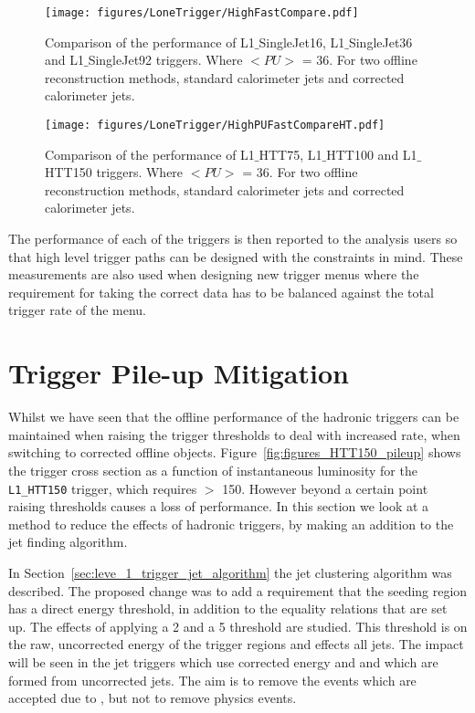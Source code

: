 \begin{figure}[htbp]
  \centering
    \texttt{[image: figures/LoneTrigger/HighFastCompare.pdf]}
  \caption{Comparison of the performance of L1$\_$SingleJet16, L1$\_$SingleJet36 and L1$\_$SingleJet92 triggers. Where $<PU>$ = 36. For two offline reconstruction methods, standard \AK calorimeter jets and \pu corrected \AK calorimeter jets.}
  \label{fig:figures_LoneTrigger_HighFastCompare}
\end{figure}

\begin{figure}[htbp]
  \centering
    \texttt{[image: figures/LoneTrigger/HighPUFastCompareHT.pdf]}
  \caption{Comparison of the performance of  L1$\_$HTT75, L1$\_$HTT100 and  L1$\_$HTT150 triggers. Where $<PU>$ = 36. For two offline reconstruction methods, standard \AK calorimeter jets and \pu corrected \AK calorimeter jets.}
  \label{fig:figures_LoneTrigger_HighPUFastCompareHT}
\end{figure}

The performance of each of the \Lone triggers is then reported to the analysis 
users so that high level trigger paths can be designed with the \Lone 
constraints in mind. These measurements are also used when designing new \Lone 
trigger menus where the requirement for taking the correct data has to be 
balanced against the total trigger rate of the \Lone menu.

\clearpage
\section{\Lone Trigger Pile-up Mitigation} %
\label{sub:lone_trigger_pile_up_mitigation}


Whilst we have seen that the offline performance of the \Lone hadronic triggers 
can be maintained when raising the trigger thresholds to deal with increased 
rate, when switching to \pu corrected offline objects. 
Figure~\ref{fig:figures_HTT150_pileup} shows the trigger cross section as a 
function of instantaneous luminosity for the \verb|L1_HTT150| trigger, which 
requires \HT $>$ \unit{150}{\GeV}. However beyond a certain point raising 
thresholds causes a loss of performance.
In this section we look at a method to reduce the effects of \pu hadronic 
\Lone triggers, by making an addition to the \Lone jet finding algorithm.

In Section~\ref{sec:leve_1_trigger_jet_algorithm} the \Lone jet clustering 
algorithm was described. The proposed change was to add a requirement that the 
seeding region has a direct energy threshold, in addition to the equality 
relations that are set up. The effects of applying a \unit{2}{\GeV} and a 
\unit{5}{\GeV} threshold are studied. This threshold is on the raw, uncorrected 
energy of the trigger regions and effects all \Lone jets. The impact will be 
seen in the \Lone jet triggers which use corrected energy and \Lone \HT and 
\HTm which are formed from uncorrected jets.
The aim is to remove the events which are accepted due to \pu, but not to 
remove physics events.

